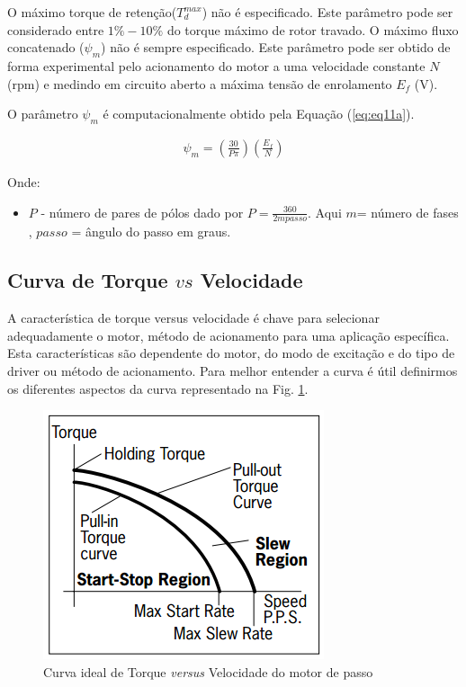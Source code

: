 O máximo torque de retenção($T_d^{max}$) não é especificado. Este parâmetro pode  ser considerado entre $1\%-10\%$ do torque máximo de rotor travado. O máximo fluxo concatenado ($\psi_m$) não é sempre especificado. Este parâmetro pode ser obtido de forma experimental pelo acionamento do motor a uma velocidade constante $N$ (rpm) e medindo em circuito aberto a máxima tensão de enrolamento $E_f$ (V).


O parâmetro $\psi_m$ é computacionalmente obtido pela Equação (\ref{eq:eq11a}).

\begin{eqnarray}
\label{eq:eq11a}
\psi_m = \left(\frac{30}{P \pi}\right) \left(\frac{E_f}{N}\right)
\end{eqnarray}

Onde:

\begin{itemize}
	\item $P$ - número de pares de pólos dado por $P = \frac{360}{2mpasso}$. Aqui $m$= número de fases , $passo$ = ângulo do passo em graus.
\end{itemize}

\subsection{Curva de Torque $vs$ Velocidade}
A característica de torque versus velocidade é chave para selecionar adequadamente o motor, método de acionamento para uma aplicação específica. Esta características são dependente do motor, do modo de excitação e do tipo de driver ou método de acionamento. Para melhor entender a curva é útil definirmos os diferentes aspectos da curva representado na Fig. \ref{fig:fig3}.

\begin{figure}[H]
	\centering
	\includegraphics[scale=.6]{Images/curvatorquevelocidade_HSM.PNG}
	\caption{ Curva ideal de Torque \textit{versus} Velocidade do motor de passo }
	\label{fig:fig3}
\end{figure}

